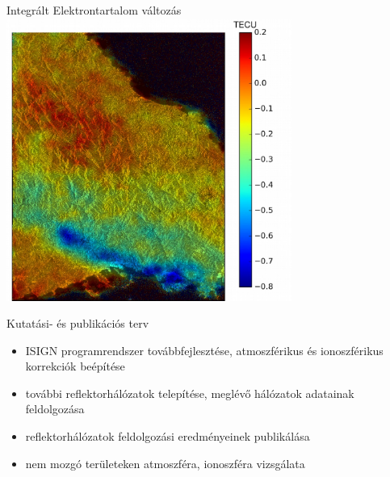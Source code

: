\documentclass{beamer}
\begin{document}
\begin{frame}{Integrált Elektrontartalom változás}
\includegraphics[width=0.7\textwidth]{iono.png}
\end{frame}


\begin{frame}{Kutatási- és publikációs terv}

\begin{itemize}
    \item ISIGN programrendszer továbbfejlesztése, atmoszférikus
    és ionoszférikus korrekciók beépítése
    \item további reflektorhálózatok telepítése, meglévő hálózatok adatainak
    feldolgozása
    \item reflektorhálózatok feldolgozási eredményeinek publikálása
    \item nem mozgó területeken atmoszféra, ionoszféra vizsgálata
\end{itemize}

\end{frame}
\end{document}
